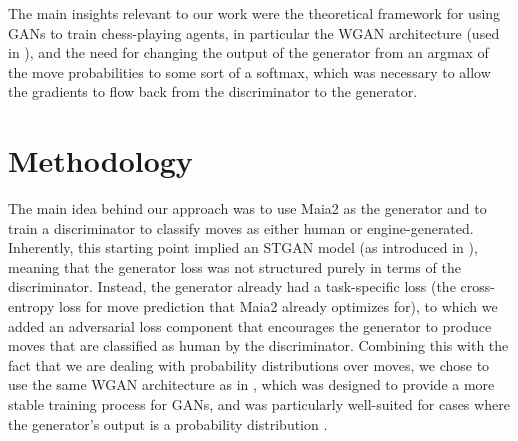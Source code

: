 The main insights relevant to our work were the theoretical framework for using GANs to train chess-playing agents, in particular the WGAN architecture (used in \cite{GAN_style}), and the need for changing the output of the generator from an argmax of the move probabilities to some sort of a softmax, which was necessary to allow the gradients to flow back from the discriminator to the generator.

\section{Methodology}
\label{section:methodology_adversarial_training}
The main idea behind our approach was to use Maia2 as the generator and to train a discriminator to classify moves as either human or engine-generated.
Inherently, this starting point implied an STGAN model (as introduced in \cite{GAN_style}), meaning that the generator loss was not structured purely in terms of the discriminator.
Instead, the generator already had a task-specific loss (the cross-entropy loss for move prediction that Maia2 already optimizes for), to which we added an adversarial loss component that encourages the generator to produce moves that are classified as human by the discriminator.
Combining this with the fact that we are dealing with probability distributions over moves, we chose to use the same WGAN architecture as in \cite{GAN_style}, which was designed to provide a more stable training process for GANs, and was particularly well-suited for cases where the generator's output is a probability distribution \cite{WGAN}.

